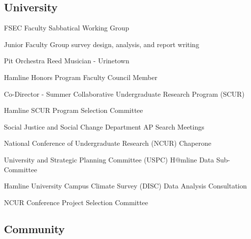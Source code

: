 \documentclass[letterpaper]{article}
\newenvironment{publist}{%
  \begin{list}{}{%
    \setlength{\leftmargin}{0cm}   %
    \setlength{\labelwidth}{2cm}     %
    \setlength{\labelsep}{0.5cm}     %
  }%
}{%
  \end{list}%
}
\begin{document}
\subsection*{University}
\begin{publist}

\item [\textbf{2026}] FSEC Faculty Sabbatical Working Group
\item Junior Faculty Group survey design, analysis, and report writing
\item[\textbf{2025}] Pit Orchestra Reed Musician - Urinetown
\item[\textbf{2024}] Hamline Honors Program Faculty Council Member
\item[\textbf{2023-}] Co-Director - Summer Collaborative Undergraduate Research Program (SCUR)
\item[\textbf{2023}] Hamline SCUR Program Selection Committee
\item Social Justice and Social Change Department AP Search Meetings
\item National Conference of Undergraduate Research (NCUR) Chaperone
\item[\textbf{2022-2024}]University and Strategic Planning Committee (USPC) H@mline Data Sub-Committee
\item[\textbf{2022}] Hamline University Campus Climate Survey (DISC) Data Analysis Consultation
\item NCUR Conference Project Selection Committee

\end{publist}

\subsection*{Community}
\end{document}
